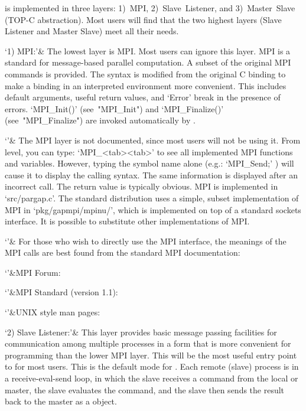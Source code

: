 {\ParGAP} is implemented in three layers: 1)~MPI, 2)~Slave~Listener,  and
3)~Master~Slave (TOP-C abstraction). Most users will find  that  the  two
highest layers (Slave Listener and Master Slave) meet all their needs.

\beginitems
`1) MPI:'&
    The lowest layer is MPI. Most users can ignore this layer. MPI  is  a
    standard for message-based parallel  computation.  A  subset  of  the
    original MPI commands is provided. The syntax is  modified  from  the
    original C binding  to  make  a  {\GAP}  binding  in  an  interpreted
    environment more convenient. This includes default arguments,  useful
    return  values,  and  `Error'  break  in  the  presence  of   errors.
    `MPI_Init()'       (see~"MPI_Init")       and        `MPI_Finalize()'
    (see~"MPI_Finalize") are invoked automatically by {\ParGAP}.

`'& The MPI layer is not documented, since most users will not  be  using
    it. From {\GAP} level, you can  type:  `MPI_<tab><tab>'  to  see  all
    implemented MPI functions and variables. However, typing  the  symbol
    name alone (e.g.: `MPI_Send;' ) will cause it to display the  calling
    syntax. The same information is displayed after  an  incorrect  call.
    The  return  value  is  typically  obvious.  MPI  is  implemented  in
    `src/pargap.c'. The  standard  distribution  uses  a  simple,  subset
    implementation of MPI in `pkg/gapmpi/mpinu/', which is implemented on
    top of a standard sockets interface. It  is  possible  to  substitute
    other implementations of MPI.

`'& For those who wish to directly use the MPI interface, the meanings of
    the MPI calls are best found from the standard MPI documentation:

`'&MPI Forum: 

`'&MPI Standard (version 1.1):

`'&UNIX style man pages: 

`2) Slave Listener:'&
    This  layer   provides   basic   message   passing   facilities   for
    communication among multiple {\ParGAP} processes in a  form  that  is
    more convenient for programming than the lower MPI layer.  This  will
    be the most useful entry point to {\ParGAP} for most users.  This  is
    the default mode for {\ParGAP}. Each remote (slave) process is  in  a
    receive-eval-send loop, in which the slave receives a {\GAP}  command
    from the local or master, the slave evaluates the {\GAP} command, and
    the slave then sends the result  back  to  the  master  as  a  {\GAP}
    object.

